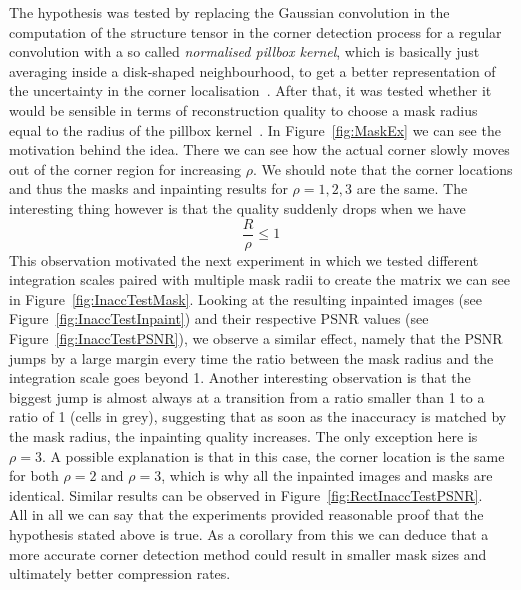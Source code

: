 \newpage\noindent The hypothesis was tested by replacing the Gaussian
convolution in the computation of the structure tensor in the corner detection process for a
regular convolution with a so called \textit{normalised pillbox kernel}, which is basically just
averaging inside a disk-shaped neighbourhood, to get a better representation of the uncertainty in
the corner localisation~\cite{conversation}. After that, it was tested whether it would be
sensible in terms of reconstruction quality to choose a mask radius equal to the radius of the
pillbox kernel~\cite{conversation}. 
In Figure~\ref{fig:MaskEx} we can see the motivation behind the
idea. There we can see how the actual corner slowly moves out of the corner region for increasing
$\rho$. We should note that the corner locations and thus the masks and inpainting results for
$\rho=1,2,3$ are the same. The interesting thing however is that the quality suddenly drops when we 
have 
\begin{equation}
    \frac{R}{\rho}\leq1
\end{equation}
This observation motivated the next experiment in which we tested different integration scales
paired with multiple mask radii to create the matrix we can see in Figure~\ref{fig:InaccTestMask}.
Looking at the resulting inpainted images (see Figure~\ref{fig:InaccTestInpaint}) and their
respective PSNR values (see Figure~\ref{fig:InaccTestPSNR}), we observe a similar effect, namely
that the PSNR jumps by a large margin every time the ratio between the mask radius and the
integration scale goes beyond 1.
Another interesting observation is that the biggest jump is almost
always at a transition from a ratio smaller than 1 to a ratio of 1 (cells in grey), suggesting that
as soon as the inaccuracy is matched by the mask radius, the inpainting quality increases. The only
exception here is $\rho=3$. A possible explanation is that in this case, the corner
location is the same for both $\rho=2$ and $\rho=3$, which is why all the inpainted images and
masks are identical. Similar results can be observed in
Figure~\ref{fig:RectInaccTestPSNR}.\\
All in all we can say that the experiments provided reasonable proof that the hypothesis stated
above is true. As a corollary from this we can deduce that a more accurate corner detection method
could result in smaller mask sizes and ultimately better compression rates.
